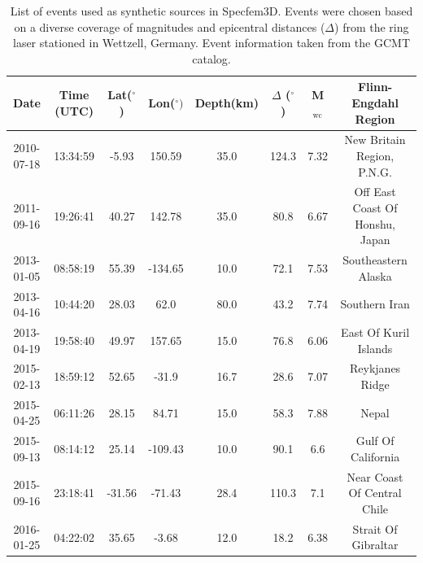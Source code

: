 \documentclass{gji}
\begin{document}
\begin{table}
\begin{minipage}{150mm}
	\begin{center}
		\begin{tabular}{ |c|c|c|c|c|c|c|c| } 
		\bf{Date} & \bf{Time (UTC)} & \bf{Lat($^\circ$)} & \bf{Lon($^\circ)$} & \bf{Depth(km)} & \bf{$\Delta$ ($^\circ$)} & \bf{M$_{\text{wc}}$} &\bf{Flinn-Engdahl Region} \\ \hline
	2010-07-18 & 13:34:59 & -5.93 & 150.59 & 35.0 & 124.3 & 7.32 & New Britain Region, P.N.G. \\
	2011-09-16 & 19:26:41 & 40.27 & 142.78 & 35.0 & 80.8 &  6.67 & Off East Coast Of Honshu, Japan \\
	2013-01-05 & 08:58:19 & 55.39 & -134.65 & 10.0 & 72.1 & 7.53 & Southeastern Alaska \\
	2013-04-16 & 10:44:20 & 28.03 & 62.0 & 80.0 & 43.2 & 7.74 & Southern Iran \\
	2013-04-19 & 19:58:40 & 49.97 & 157.65 & 15.0 &76.8 & 6.06 & East Of Kuril Islands \\
	2015-02-13 & 18:59:12 & 52.65 & -31.9 & 16.7 & 28.6 & 7.07 & Reykjanes Ridge \\
	2015-04-25 & 06:11:26 & 28.15 & 84.71 & 15.0 & 58.3 & 7.88 & Nepal \\
	2015-09-13 & 08:14:12 & 25.14 & -109.43 & 10.0 & 90.1 & 6.6 & Gulf Of California \\
	2015-09-16 & 23:18:41 & -31.56 & -71.43 & 28.4 & 110.3 & 7.1 & Near Coast Of Central Chile \\
	2016-01-25 & 04:22:02 & 35.65 & -3.68 & 12.0 & 18.2 & 6.38 & Strait Of Gibraltar \\
		\end{tabular}
    		\caption{List of events used as synthetic sources in Specfem3D. Events were chosen based on a diverse coverage of magnitudes and epicentral distances ($\Delta$) from the ring laser stationed in Wettzell, Germany. Event information taken from the GCMT catalog.}
		\label{tab:syn_events}
	\end{center}
	\end{minipage}
\end{table}
\end{document}
